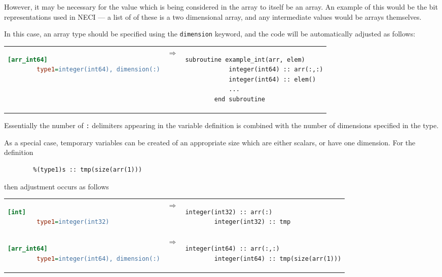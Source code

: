\documentclass[a4paper,notitlepage]{scrreprt}
\let\code\lstinline
\begin{document}
{{	However, it may be necessary for the value which is being considered in
	the array to itself be an array. An example of this would be the bit
	representations used in NECI --- a list of of these is a two dimensional
	array, and any intermediate values would be arrays themselves.

	In this case, an array type should be specified using the \code{dimension}
	keyword, and the code will be automatically adjusted as follows:

	\begin{tabular}{lcl}
	\begin{lstlisting}[language=ini,gobble=8]
		[arr_int64]
		type1=integer(int64), dimension(:)
	\end{lstlisting}

	& $\Longrightarrow$ &

	\begin{lstlisting}[gobble=8]
		subroutine example_int(arr, elem)
			integer(int64) :: arr(:,:)
			integer(int64) :: elem()
			...
		end subroutine
	\end{lstlisting}
	\end{tabular}

	Essentially the number of \code{:} delimiters appearing in the variable
	definition is combined with the number of dimensions specified in the type.

	As a special case, temporary variables can be created of an appropriate
	size which are either scalars, or have one dimension. For the definition
	\begin{lstlisting}[gobble=4]
		%(type1)s :: arr(:)
		%(type1)s :: tmp(size(arr(1)))
	\end{lstlisting}
	then adjustment occurs as follows

	\begin{tabular}{lcl}
	\begin{lstlisting}[language=ini,gobble=8]
		[int]
		type1=integer(int32)
	\end{lstlisting}
	& $\Longrightarrow$ &
	\begin{lstlisting}[gobble=8]
		integer(int32) :: arr(:)
		integer(int32) :: tmp
	\end{lstlisting} \\[1.5em]

	\begin{lstlisting}[language=ini,gobble=8]
		[arr_int64]
		type1=integer(int64), dimension(:)
	\end{lstlisting}
	& $\Longrightarrow$ &
	\begin{lstlisting}[gobble=8]
		integer(int64) :: arr(:,:)
		integer(int64) :: tmp(size(arr(1)))
	\end{lstlisting}
	\end{tabular}

}}
\end{document}
